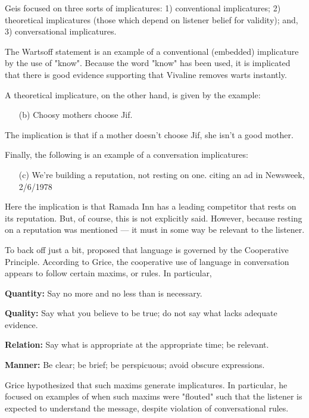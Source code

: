 Geis focused on three sorts of implicatures: 1) conventional implicatures; 2) theoretical implicatures (those which depend on listener belief for validity); and, 3) conversational implicatures.  

The Wartsoff statement is an example of a conventional (embedded) implicature by the use of "know". Because the word "know" has been used, it is implicated that there is good evidence supporting that Vivaline removes warts instantly.

A theoretical implicature, on the other hand, is given by the example:
\begin{itemize}
\item[(b)] Choosy mothers choose Jif. \citep[p. 48]{Geis:1982uf}
\end{itemize}
The implication is that if a mother doesn't choose Jif, she isn't a good mother.

Finally, the following is an example of a conversation implicatures:
\begin{itemize}
\item[(c)] We're building a reputation, not resting on one. \citep[p. 50]{Geis:1982uf} citing an ad in Newsweek, 2/6/1978
\end{itemize}

Here the implication is that Ramada Inn has a leading competitor that rests on its reputation. But, of course, this is not explicitly said. However, because resting on a reputation was mentioned --- it must in some way be relevant to the listener.

To back off just a bit, \cite{Grice:1975vz} proposed that language is governed by the Cooperative Principle. According to Grice, the cooperative use of language in conversation appears to follow certain maxims, or rules. In particular,

\begin{description}
\item \textbf{Quantity:} Say no more and no less than is necessary.
\item \textbf{Quality:} Say what you believe to be true; do not say what lacks adequate evidence.
\item \textbf{Relation:} Say what is appropriate at the appropriate time; be relevant.
\item \textbf{Manner:} Be clear; be brief; be perspicuous; avoid obscure expressions.
\end{description}

Grice hypothesized that such maxims generate implicatures. In particular, he focused on examples of when such maxims were "flouted" such that the listener is expected to understand the message, despite violation of  conversational rules.

